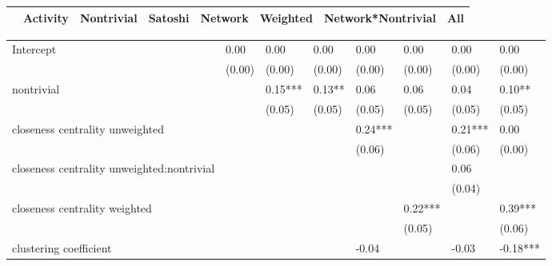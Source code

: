 \begin{table*}
\caption{Log(Volume) model OLS parameter estimates with heteroskedasticity robust SE after ElasticNet variable selection}
\begin{center}
\begin{tabular}{lccccccc}
\hline
                                                 & Activity & Nontrivial & Satoshi & Network &   Weighted   & Network*Nontrivial &   All     \\
\hline
\hline
\end{tabular}
\begin{tabular}{llllllll}
Intercept                                        & 0.00     & 0.00       & 0.00    & 0.00    & 0.00         & 0.00               & 0.00      \\
                                                 & (0.00)   & (0.00)     & (0.00)  & (0.00)  & (0.00)       & (0.00)             & (0.00)    \\
nontrivial                                       &          & 0.15***    & 0.13**  & 0.06    & 0.06         & 0.04               & 0.10**    \\
                                                 &          & (0.05)     & (0.05)  & (0.05)  & (0.05)       & (0.05)             & (0.05)    \\
 closeness centrality unweighted            &          &            &         & 0.24*** &              & 0.21***            & 0.00      \\
                                                 &          &            &         & (0.06)  &              & (0.06)             & (0.00)    \\
 closeness centrality unweighted:nontrivial &          &            &         &         &              & 0.06               &           \\
                                                 &          &            &         &         &              & (0.04)             &           \\
 closeness centrality weighted              &          &            &         &         & 0.22***      &                    & 0.39***   \\
                                                 &          &            &         &         & (0.05)       &                    & (0.06)    \\
 clustering coefficient                     &          &            &         & -0.04   &              & -0.03              & -0.18***  \\

\end{tabular}
\end{center}
\end{table*}
